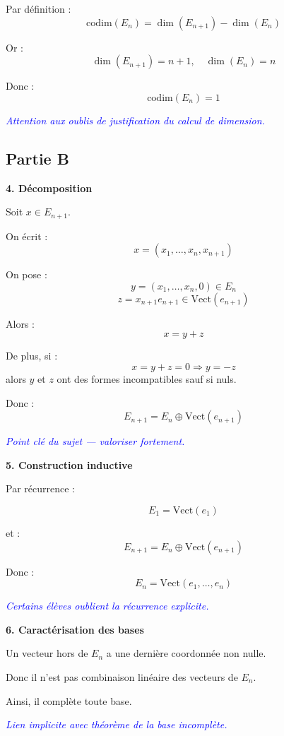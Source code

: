 \documentclass[11pt,a4paper]{article}
\newcommand{\commentaire}[1]{\textcolor{blue}{\textit{#1}}}
\begin{document}
Par définition :
\[
\mathrm{codim}(E_n)=\dim(E_{n+1})-\dim(E_n)
\]

Or :
\[
\dim(E_{n+1})=n+1, \quad \dim(E_n)=n
\]

Donc :
\[
\boxed{\mathrm{codim}(E_n)=1}
\]

\commentaire{Attention aux oublis de justification du calcul de dimension.}

\subsection*{Partie B}

\textbf{4. Décomposition}

Soit $x \in E_{n+1}$.

On écrit :
\[
x=(x_1,\dots,x_n,x_{n+1})
\]

On pose :
\[
y=(x_1,\dots,x_n,0) \in E_n
\]
\[
z=x_{n+1}e_{n+1} \in \mathrm{Vect}(e_{n+1})
\]

Alors :
\[
x=y+z
\]

De plus, si :
\[
x=y+z=0
\Rightarrow y=-z
\]
alors $y$ et $z$ ont des formes incompatibles sauf si nuls.

Donc :
\[
E_{n+1}=E_n \oplus \mathrm{Vect}(e_{n+1})
\]

\commentaire{Point clé du sujet — valoriser fortement.}


\textbf{5. Construction inductive}

Par récurrence :

\[
E_1=\mathrm{Vect}(e_1)
\]

et :
\[
E_{n+1}=E_n \oplus \mathrm{Vect}(e_{n+1})
\]

Donc :
\[
E_n=\mathrm{Vect}(e_1,\dots,e_n)
\]

\commentaire{Certains élèves oublient la récurrence explicite.}


\textbf{6. Caractérisation des bases}

Un vecteur hors de $E_n$ a une dernière coordonnée non nulle.

Donc il n’est pas combinaison linéaire des vecteurs de $E_n$.

Ainsi, il complète toute base.

\commentaire{Lien implicite avec théorème de la base incomplète.}

\end{document}
